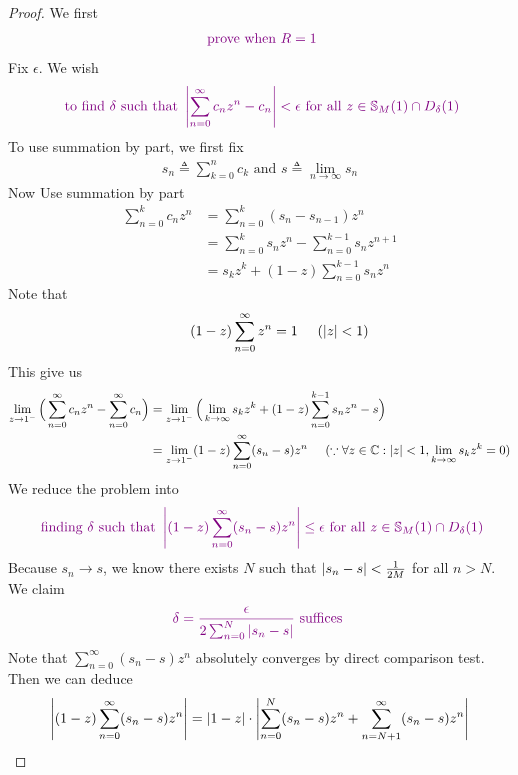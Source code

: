 \documentclass{report}
\begin{document}
\begin{proof}
We first 
\begin{align*}
\textcolor{violet}{\text{ prove when }R=1}
\end{align*}
Fix $\epsilon $. We wish  
\begin{align*}
\textcolor{violet}{\text{ to find $\delta$ such that }\left|\sum_{n=0}^{\infty}c_nz^n-c_n\right|<\epsilon \text{ for all }z \in \mathbb{S}_M(1)\cap D_\delta(1)}
\end{align*}
To use summation by part, we first fix 
\begin{align*}
s_n\triangleq \sum_{k=0}^{n}c_k\text{ and }s\triangleq \lim_{n\to \infty}s_n
\end{align*}
Now Use summation by part 
\begin{align*}
\sum_{n=0}^k c_nz^n&=\sum_{n=0}^{k}(s_n-s_{n-1})z^n\\
&=\sum_{n=0}^k s_nz^n - \sum_{n=0}^{k-1} s_nz^{n+1}\\
&=s_kz^k+(1-z)\sum_{n=0}^{k-1} s_nz^n
\end{align*}
Note that 
\begin{align*}
  \hspace{1cm}(1-z)\sum_{n=0}^{\infty}z^n=1\hspace{0.5cm}(\left|z\right|<1)
\end{align*}
This give us 
\begin{align*}
\lim_{z\to 1^-}\Big( \sum_{n=0}^{\infty}c_nz^n- \sum_{n=0}^\infty c_n \Big)&= \lim_{z\to 1^-} \Big( \lim_{k\to \infty} s_kz^k  + (1-z)\sum_{n=0}^{k-1} s_nz^n - s\Big)\\
&=\lim_{z\to 1^-}  (1-z)\sum_{n=0}^{\infty} (s_n-s)z^n\hspace{0.5cm}(\because \forall z\in\mathbb{C}:\left|z\right|<1, \lim_{k\to \infty}s_kz^k=0)
\end{align*}
We reduce the problem into 
\begin{align*}
  \textcolor{violet}{\text{ finding }\delta\text{ such that }\left|(1-z)\sum_{n=0}^{\infty}(s_n-s)z^n\right|\leq \epsilon \text{ for all }z \in \mathbb{S}_M(1)\cap D_\delta(1)}
\end{align*}
Because $s_n \to s$, we know there exists $N$ such that $\left|s_n-s\right|<\frac{1}{2M}$ for all $n>N$. We claim 
\begin{align*}
\textcolor{violet}{\delta= \frac{\epsilon }{2\sum_{n=0}^N \left|s_n-s\right|}\text{ suffices }}
\end{align*}
Note that $\sum_{n=0}^{\infty}(s_n-s)z^n$ absolutely converges by direct comparison test. Then we can deduce
\begin{align*}
  \abso{(1-z)\sum_{n=0}^{\infty}(s_n-s)z^n}&=  \abso{1-z}\cdot \abso{\sum_{n=0}^{N}(s_n-s)z^n+\sum_{n=N+1}^{\infty}(s_n-s)z^n}\\

\end{align*}
\end{proof}
\end{document}
